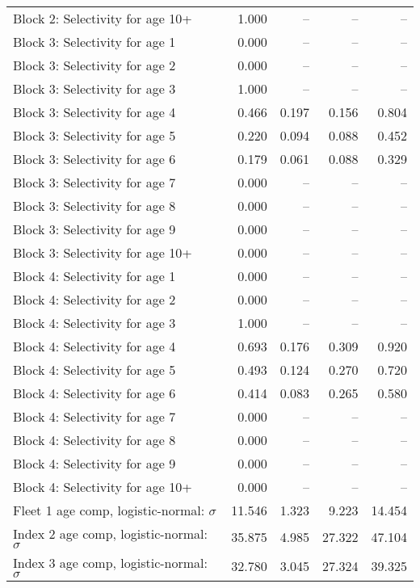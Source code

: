 \documentclass[
]{article}
\begin{document}
\begin{landscape}
\begin{longtable}[t]{lrrrr}
Block 2: Selectivity for age 10+ & 1.000 & -- & -- & --\\
Block 3: Selectivity for age 1 & 0.000 & -- & -- & --\\
Block 3: Selectivity for age 2 & 0.000 & -- & -- & --\\
Block 3: Selectivity for age 3 & 1.000 & -- & -- & --\\
\addlinespace
Block 3: Selectivity for age 4 & 0.466 & 0.197 & 0.156 & 0.804\\
Block 3: Selectivity for age 5 & 0.220 & 0.094 & 0.088 & 0.452\\
Block 3: Selectivity for age 6 & 0.179 & 0.061 & 0.088 & 0.329\\
Block 3: Selectivity for age 7 & 0.000 & -- & -- & --\\
Block 3: Selectivity for age 8 & 0.000 & -- & -- & --\\
\addlinespace
Block 3: Selectivity for age 9 & 0.000 & -- & -- & --\\
Block 3: Selectivity for age 10+ & 0.000 & -- & -- & --\\
Block 4: Selectivity for age 1 & 0.000 & -- & -- & --\\
Block 4: Selectivity for age 2 & 0.000 & -- & -- & --\\
Block 4: Selectivity for age 3 & 1.000 & -- & -- & --\\
\addlinespace
Block 4: Selectivity for age 4 & 0.693 & 0.176 & 0.309 & 0.920\\
Block 4: Selectivity for age 5 & 0.493 & 0.124 & 0.270 & 0.720\\
Block 4: Selectivity for age 6 & 0.414 & 0.083 & 0.265 & 0.580\\
Block 4: Selectivity for age 7 & 0.000 & -- & -- & --\\
Block 4: Selectivity for age 8 & 0.000 & -- & -- & --\\
\addlinespace
Block 4: Selectivity for age 9 & 0.000 & -- & -- & --\\
Block 4: Selectivity for age 10+ & 0.000 & -- & -- & --\\
Fleet 1 age comp, logistic-normal: $\sigma$ & 11.546 & 1.323 & 9.223 & 14.454\\
Index 2 age comp, logistic-normal: $\sigma$ & 35.875 & 4.985 & 27.322 & 47.104\\
Index 3 age comp, logistic-normal: $\sigma$ & 32.780 & 3.045 & 27.324 & 39.325\\*
\end{longtable}
\end{landscape}
\end{document}
